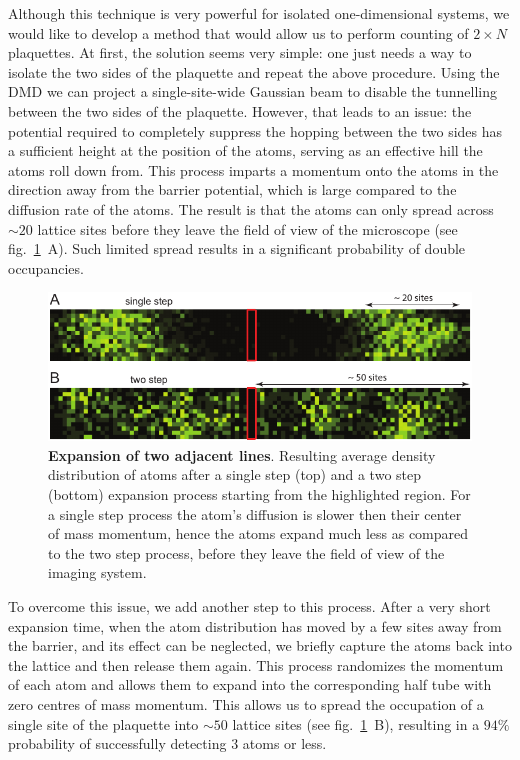Although this technique is very powerful for isolated one-dimensional systems, we would like to develop a method that would allow us to perform counting of $2\times N$ plaquettes. At first, the solution seems very simple: one just needs a way to isolate the two sides of the plaquette and repeat the above procedure. Using the DMD we can project a single-site-wide Gaussian beam to disable the tunnelling between the two sides of the plaquette. However, that leads to an issue: the potential required to completely suppress the hopping between the two sides has a sufficient height at the position of the atoms, serving as an effective hill the atoms roll down from. This process imparts a momentum onto the atoms in the direction away from the barrier potential, which is large compared to the diffusion rate of the atoms. The result is that the atoms can only spread across $\sim 20$ lattice sites before they leave the field of view of the microscope (see fig.~\ref{fig:CTE_expansion}~A). Such limited spread results in a significant probability of double occupancies.

\begin{figure}[t]
	\centering
	\includegraphics[scale=1]{figures/CTE_expansion.pdf}
	\caption{{\bf Expansion of two adjacent lines}. Resulting average density distribution of atoms after a single step (top) and a two step (bottom) expansion process starting from the highlighted region. For a single step process the atom's diffusion is slower then their center of mass momentum, hence the atoms expand much less as compared to the two step process, before they leave the field of view of the imaging system.}
	\label{fig:CTE_expansion}
\end{figure}

To overcome this issue, we add another step to this process. After a very short expansion time, when the atom distribution has moved by a few sites away from the barrier, and its effect can be neglected, we briefly capture the atoms back into the lattice and then release them again. This process randomizes the momentum of each atom and allows them to expand into the corresponding half tube with zero centres of mass momentum. This allows us to spread the occupation of a single site of the plaquette into $\sim 50$ lattice sites (see fig.~\ref{fig:CTE_expansion}~B), resulting in a $94\%$ probability of successfully detecting $3$ atoms or less. 